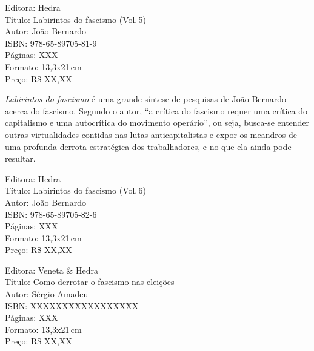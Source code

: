 \begin{ficha}
Editora: Hedra\\
Título: Labirintos do fascismo (Vol.\,5)\\
Autor: João Bernardo\\ 
ISBN: 978-65-89705-81-9\\
Páginas: XXX\\
Formato: 13,3x21\,cm\\
Preço: R\$ XX,XX\\
\end{ficha}

\pagebreak


\noindent{}\textit{Labirintos do fascismo} é uma grande síntese de pesquisas de João Bernardo acerca do fascismo. Segundo o autor, ``a crítica do fascismo requer uma crítica do capitalismo e uma autocrítica do movimento operário'', ou seja, busca-se entender outras virtualidades contidas nas lutas anticapitalistas e expor os meandros de uma profunda derrota estratégica dos trabalhadores, e no que ela ainda pode resultar. %

\begin{ficha}
Editora: Hedra\\
Título: Labirintos do fascismo (Vol.\,6)\\
Autor: João Bernardo\\ 
ISBN: 978-65-89705-82-6\\
Páginas: XXX\\
Formato: 13,3x21\,cm\\
Preço: R\$ XX,XX\\
\end{ficha}

\pagebreak


\noindent{}\lipsum[2]

\begin{ficha}
Editora: Veneta \& Hedra\\
Título: Como derrotar o fascismo nas eleições\\
Autor: Sérgio Amadeu\\ 
ISBN: XXXXXXXXXXXXXXXXX\\
Páginas: XXX\\
Formato: 13,3x21\,cm\\
Preço: R\$ XX,XX\\
\end{ficha}


